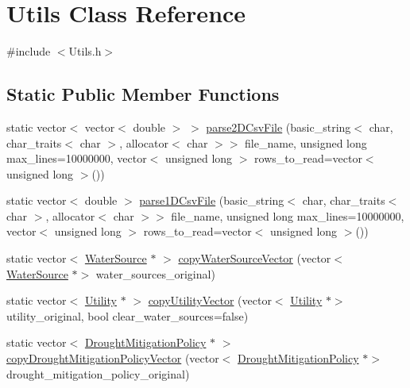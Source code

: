 \hypertarget{classUtils}{}\section{Utils Class Reference}
\label{classUtils}


{\ttfamily \#include $<$Utils.\+h$>$}

\subsection*{Static Public Member Functions}
\begin{DoxyCompactItemize}
\item 
static vector$<$ vector$<$ double $>$ $>$ \mbox{\hyperlink{classUtils_ab1dced1d690056b012aec72d28cd4176_ab1dced1d690056b012aec72d28cd4176}{parse2\+D\+Csv\+File}} (basic\+\_\+string$<$ char, char\+\_\+traits$<$ char $>$, allocator$<$ char $>$$>$ file\+\_\+name, unsigned long max\+\_\+lines=10000000, vector$<$ unsigned long $>$ rows\+\_\+to\+\_\+read=vector$<$ unsigned long $>$())
\item 
static vector$<$ double $>$ \mbox{\hyperlink{classUtils_a575cc5fb290f083a3101a8f0969ae483_a575cc5fb290f083a3101a8f0969ae483}{parse1\+D\+Csv\+File}} (basic\+\_\+string$<$ char, char\+\_\+traits$<$ char $>$, allocator$<$ char $>$$>$ file\+\_\+name, unsigned long max\+\_\+lines=10000000, vector$<$ unsigned long $>$ rows\+\_\+to\+\_\+read=vector$<$ unsigned long $>$())
\item 
static vector$<$ \mbox{\hyperlink{classWaterSource}{Water\+Source}} $\ast$ $>$ \mbox{\hyperlink{classUtils_ad83b39de47909892725f2d9a8ee0ff1a_ad83b39de47909892725f2d9a8ee0ff1a}{copy\+Water\+Source\+Vector}} (vector$<$ \mbox{\hyperlink{classWaterSource}{Water\+Source}} $\ast$$>$ water\+\_\+sources\+\_\+original)
\item 
static vector$<$ \mbox{\hyperlink{classUtility}{Utility}} $\ast$ $>$ \mbox{\hyperlink{classUtils_aae13775d0c17ca43ae39450188958d7d_aae13775d0c17ca43ae39450188958d7d}{copy\+Utility\+Vector}} (vector$<$ \mbox{\hyperlink{classUtility}{Utility}} $\ast$$>$ utility\+\_\+original, bool clear\+\_\+water\+\_\+sources=false)
\item 
static vector$<$ \mbox{\hyperlink{classDroughtMitigationPolicy}{Drought\+Mitigation\+Policy}} $\ast$ $>$ \mbox{\hyperlink{classUtils_ac387c706746bffa0308e1fad7a6cd7a6_ac387c706746bffa0308e1fad7a6cd7a6}{copy\+Drought\+Mitigation\+Policy\+Vector}} (vector$<$ \mbox{\hyperlink{classDroughtMitigationPolicy}{Drought\+Mitigation\+Policy}} $\ast$$>$ drought\+\_\+mitigation\+\_\+policy\+\_\+original)
$$
\end{DoxyCompactItemize}
